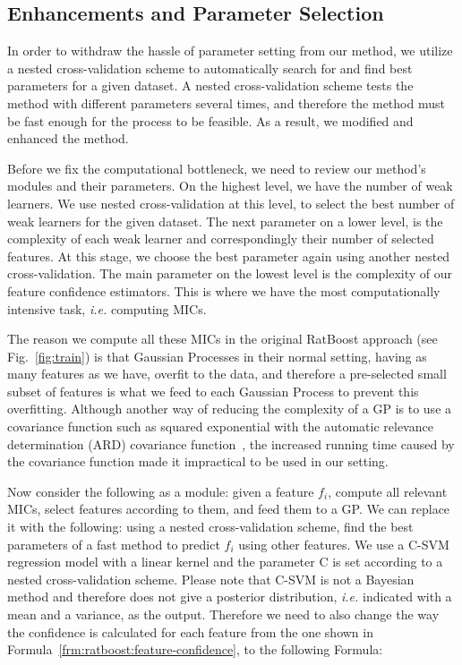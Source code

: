 \subsection{Enhancements and Parameter Selection}
\label{sec:adaptive:ratboost-enhanced}
In order to withdraw the hassle of parameter setting from our method, we utilize a nested cross-validation scheme to automatically search for and find best parameters for a given dataset. A nested cross-validation scheme tests the method with different parameters several times, and therefore the method must be fast enough for the process to be feasible. As a result, we modified and enhanced the method.

Before we fix the computational bottleneck, we need to review our method's modules and their parameters. On the highest level, we have the number of weak learners. We use nested cross-validation at this level, to select the best number of weak learners for the given dataset. The next parameter on a lower level, is the complexity of each weak learner and correspondingly their number of selected features. At this stage, we choose the best parameter again using another nested cross-validation. The main parameter on the lowest level is the complexity of our feature confidence estimators. This is where we have the most computationally intensive task, \emph{i.e.} computing MICs.

The reason we compute all these MICs in the original RatBoost approach (see Fig.~\ref{fig:train}) is that Gaussian Processes in their normal setting, having as many features as we have, overfit to the data, and therefore a pre-selected small subset of features is what we feed to each Gaussian Process to prevent this overfitting. Although another way of reducing the complexity of a GP is to use a covariance function such as squared exponential with the automatic relevance determination (ARD) covariance function~\cite{gaussian-processes}, the increased running time caused by the covariance function made it impractical to be used in our setting.

Now consider the following as a module: given a feature $f_i$, compute all relevant MICs, select features according to them, and feed them to a GP. We can replace it with the following: using a nested cross-validation scheme, find the best parameters of a fast method to predict $f_i$ using other features. We use a C-SVM regression model with a linear kernel and the parameter C is set according to a nested cross-validation scheme. Please note that C-SVM is not a Bayesian method and therefore does not give a posterior distribution, \emph{i.e.} indicated with a mean and a variance, as the output. Therefore we need to also change the way the confidence is calculated for each feature from the one shown in Formula~\ref{frm:ratboost:feature-confidence}, to the following Formula:

